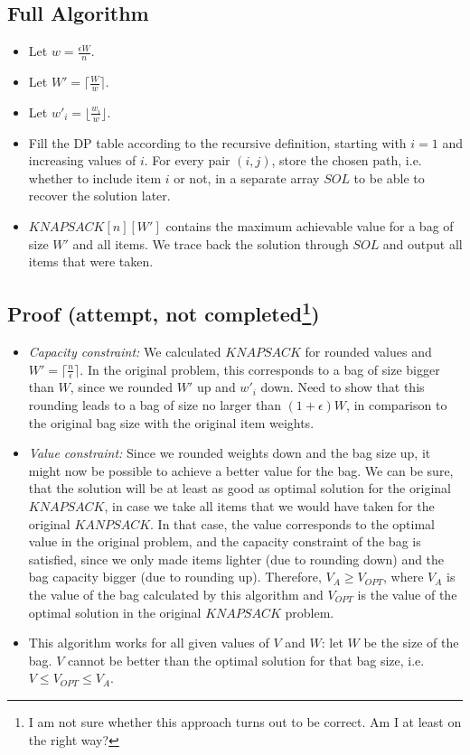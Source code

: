 \documentclass[12pt]{article}
\begin{document}
\subsection*{Full Algorithm}
\begin{itemize}
	\item Let $w = \frac{\epsilon W}{n}$.
	\item Let $W' = \lceil \frac{W}{w} \rceil$.
	\item Let $w'_i = \lfloor \frac{w_i}{w} \rfloor$.
	\item Fill the DP table according to the recursive definition, starting with $i=1$ and increasing values of $i$. For every pair $(i,j)$, store the chosen path, i.e. whether to include item $i$ or not, in a separate array $\mathit{SOL}$ to be able to recover the solution later.
	\item $\mathit{KNAPSACK}[n][W']$ contains the maximum achievable value for a bag of size $W'$ and all items. We trace back the solution through $\mathit{SOL}$ and output all items that were taken.
\end{itemize}

\subsection*{Proof (attempt, not completed\footnote{I am not sure whether this approach turns out to be correct. Am I at least on the right way?})}
\begin{itemize}
	\item \emph{Capacity constraint:} We calculated $\mathit{KNAPSACK}$ for rounded values and $W' = \lceil \frac{n}{\epsilon} \rceil$. In the original problem, this corresponds to a bag of size bigger than $W$, since we rounded $W'$ up and $w'_i$ down. Need to show that this rounding leads to a bag of size no larger than $(1+\epsilon) W$, in comparison to the original bag size with the original item weights.
	\item \emph{Value constraint:} Since we rounded weights down and the bag size up, it might now be possible to achieve a better value for the bag. We can be sure, that the solution will be at least as good as optimal solution for the original $\mathit{KNAPSACK}$, in case we take all items that we would have taken for the original $
\mathit{KANPSACK}$. In that case, the value corresponds to the optimal value in the original problem, and the capacity constraint of the bag is satisfied, since we only made items lighter (due to rounding down) and the bag capacity bigger (due to rounding up). Therefore, $V_A \geq V_{\mathit{OPT}}$, where $V_A$ is the value of the bag calculated by this algorithm and $V_\mathit{OPT}$ is the value of the optimal solution in the original $\mathit{KNAPSACK}$ problem.
	\item This algorithm works for all given values of $V$ and $W$: let $W$ be the size of the bag. $V$ cannot be better than the optimal solution for that bag size, i.e. $V \leq V_{\mathit{OPT}} \leq V_A$.
\end{itemize}
\end{document}
